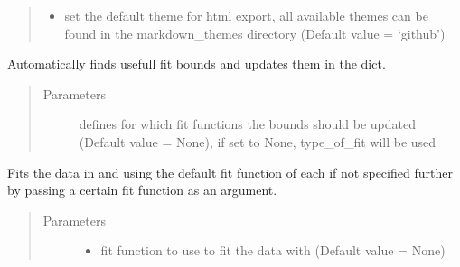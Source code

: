 \documentclass[letterpaper,10pt,english]{sphinxmanual}
\begin{document}
\begin{fulllineitems}
\begin{fulllineitems}
\begin{quote}
\begin{description}
\begin{itemize}
\item {} 
 \textendash{} set the default theme for html export, all
available themes can be found in the markdown\_themes
directory (Default value = ‘github’)

\end{itemize}

\end{description}\end{quote}

\end{fulllineitems}


\begin{fulllineitems}
\label{\detokenize{measurement:measurement.Measurement.find_bounds}}
Automatically finds usefull fit bounds and updates them
in the  dict.
\begin{quote}\begin{description}
\item[{Parameters}] \leavevmode
{} \textendash{} defines for which fit functions the
bounds should be updated (Default
value = None), if set to None, type\_of\_fit
will be used

\end{description}\end{quote}

\end{fulllineitems}


\begin{fulllineitems}
\label{\detokenize{measurement:measurement.Measurement.fit}}
Fits the data in  and  using the default fit function of each
 if not specified further by passing a certain fit function as an
argument.
\begin{quote}\begin{description}
\item[{Parameters}] \leavevmode\begin{itemize}
\item {} 
 \textendash{} fit function to use to fit the data with (Default value = None)


\end{itemize}
\end{description}
\end{quote}
\end{fulllineitems}
\end{fulllineitems}
\end{document}
